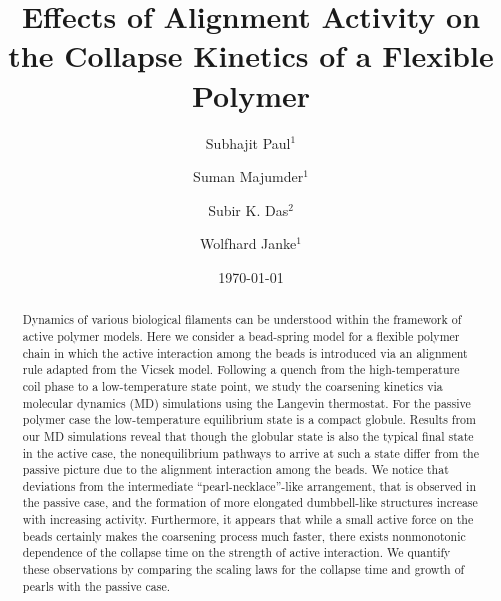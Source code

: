 \documentclass[aps,prx,reprint,showpacs,showkeys,noeprint,longbibliography]{revtex4-1} %
\begin{document}
\title{Effects of Alignment Activity on the Collapse Kinetics of a Flexible Polymer}
\author{ Subhajit Paul$^1$} 
\author {Suman Majumder$^1$}
\author {Subir K. Das$^2$}
\author{Wolfhard Janke$^1$}

\date{\today}

\begin{abstract}
Dynamics of various biological filaments can be understood within the framework of active polymer models. 
Here we consider a bead-spring model for a flexible polymer chain in which the active interaction among 
the beads is introduced via an alignment rule adapted from the Vicsek model.  Following a quench from the high-temperature coil phase to a low-temperature state point, 
we study the  coarsening kinetics via molecular dynamics (MD) simulations using the  Langevin thermostat. 
For the passive polymer case the low-temperature equilibrium state is a compact globule. 
Results from our MD simulations reveal that though the globular state is also  the typical final state in the active case, 
	the nonequilibrium pathways to arrive at such a state differ from the passive picture
	due to the alignment interaction among the beads.  
	We notice that deviations from the intermediate ``pearl-necklace''-like arrangement, that is
	observed in the passive case,
and the formation of more elongated dumbbell-like structures increase with increasing activity. 
Furthermore, it appears that while a small active force on the beads certainly makes the coarsening process much faster, 
there exists nonmonotonic dependence of the collapse time on the strength of active interaction.  
We quantify these observations by comparing the scaling laws for the collapse time and growth of pearls with the passive case.
\end{abstract}

\maketitle
\end{document}
